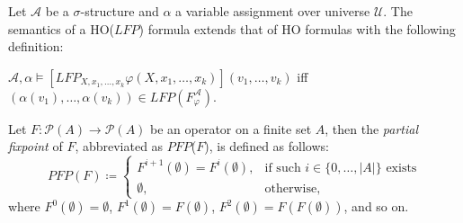 \begin{frame}

\begin{definition}
Let $\mathcal{A}$ be a $\sigma$-structure and $\alpha$ a variable assignment over universe $\mathcal{U}$. The
semantics of a HO($\mathit{LFP}$) formula extends that of HO formulas with the following definition:
\begin{compactitem}
\item $\mathcal{A}, \alpha \models [\mathit{LFP}_{X, x_1, \dots, x_k}\varphi(X, x_1, \dots, x_k)](v_1, \dots,
v_k)$ iff $(\alpha(v_1), \dots, \alpha(v_k)) \in \mathit{LFP}(F_\varphi^\mathcal{A})$.
\end{compactitem}
\end{definition}

\end{frame}

\begin{frame}

\begin{definition}
Let $F\colon \mathscr{P}(A) \rightarrow \mathscr{P}(A)$ be an operator on a finite set $A$, then the \emph{partial
fixpoint} of $F$, abbreviated as $\mathit{PFP}$($F$), is defined as follows:
\[\mathit{PFP}(F)\coloneqq\begin{cases}
F^{i+1}(\emptyset)=F^i(\emptyset),  & \text{if such } i \in \{0,\dots,|A|\} \text{ exists}\\
\emptyset, & \text{otherwise,}
\end{cases}\]
where $F^0(\emptyset) = \emptyset$, $F^1(\emptyset) = F(\emptyset)$, $F^2(\emptyset) = F(F(\emptyset))$, and so on.
\end{definition}

\end{frame}